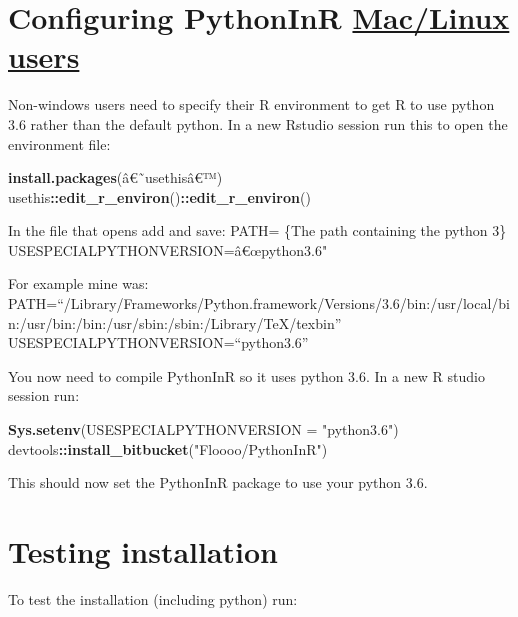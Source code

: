 \documentclass[]{article}
\newcommand{\euro}{€}
\newenvironment{Shaded}{\begin{snugshade}}{\end{snugshade}}
\newcommand{\KeywordTok}[1]{\textcolor[rgb]{0.13,0.29,0.53}{\textbf{#1}}}
\newcommand{\DataTypeTok}[1]{\textcolor[rgb]{0.13,0.29,0.53}{#1}}
\newcommand{\StringTok}[1]{\textcolor[rgb]{0.31,0.60,0.02}{#1}}
\newcommand{\OperatorTok}[1]{\textcolor[rgb]{0.81,0.36,0.00}{\textbf{#1}}}
\newcommand{\NormalTok}[1]{#1}
\begin{document}
\section{\texorpdfstring{Configuring PythonInR
\protect\hyperlink{maclinux-users}{Mac/Linux
users}}{Configuring PythonInR Mac/Linux users}}\label{configuring-pythoninr-maclinux-users}

Non-windows users need to specify their R environment to get R to use
python 3.6 rather than the default python. In a new Rstudio session run
this to open the environment file:

\begin{Shaded}
\begin{Highlighting}[]
\KeywordTok{install.packages}\NormalTok{(â€˜usethisâ€™)}
\NormalTok{usethis}\OperatorTok{::}\KeywordTok{edit_r_environ}\NormalTok{()}\OperatorTok{::}\KeywordTok{edit_r_environ}\NormalTok{()}
\end{Highlighting}
\end{Shaded}

In the file that opens add and save: PATH= \{The path containing the
python 3\} USESPECIALPYTHONVERSION=â\euro{}œpython3.6"

For example mine was:
PATH=``/Library/Frameworks/Python.framework/Versions/3.6/bin:/usr/local/bin:/usr/bin:/bin:/usr/sbin:/sbin:/Library/TeX/texbin''
USESPECIALPYTHONVERSION=``python3.6''

You now need to compile PythonInR so it uses python 3.6. In a new R
studio session run:

\begin{Shaded}
\begin{Highlighting}[]
\KeywordTok{Sys.setenv}\NormalTok{(}\DataTypeTok{USESPECIALPYTHONVERSION =} \StringTok{"python3.6"}\NormalTok{)}
\NormalTok{devtools}\OperatorTok{::}\KeywordTok{install_bitbucket}\NormalTok{(}\StringTok{"Floooo/PythonInR"}\NormalTok{)}
\end{Highlighting}
\end{Shaded}

This should now set the PythonInR package to use your python 3.6.

\section{Testing installation}\label{testing-installation}

To test the installation (including python) run:
\end{document}
